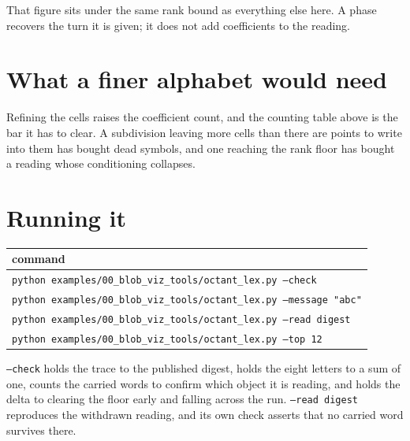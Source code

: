 That figure sits under the same rank bound as everything else here. A phase recovers the turn it is given; it does not add coefficients to the reading.

\section{What a finer alphabet would need}

Refining the cells raises the coefficient count, and the counting table above is the bar it has to clear. A subdivision leaving more cells than there are points to write into them has bought dead symbols, and one reaching the rank floor has bought a reading whose conditioning collapses.

\section{Running it}

\begin{center}
\begin{tabular}{@{}l@{}}
\toprule
command \\
\midrule
\texttt{python examples/00\_blob\_viz\_tools/octant\_lex.py --check} \\
\texttt{python examples/00\_blob\_viz\_tools/octant\_lex.py --message "abc"} \\
\texttt{python examples/00\_blob\_viz\_tools/octant\_lex.py --read digest} \\
\texttt{python examples/00\_blob\_viz\_tools/octant\_lex.py --top 12} \\
\bottomrule
\end{tabular}
\end{center}

\texttt{--check} holds the trace to the published digest, holds the eight letters to a sum of one, counts the carried words to confirm which object it is reading, and holds the delta to clearing the floor early and falling across the run. \texttt{--read digest} reproduces the withdrawn reading, and its own check asserts that no carried word survives there.
